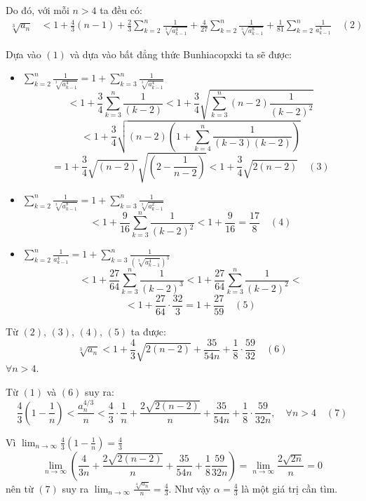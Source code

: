 \documentclass{article}
\begin{document}
Do đó, với mỗi $n > 4$ ta đều có:
\begin{align*}
\sqrt[3]{a_n} &< 1 + \frac{4}{3} (n-1) + 
\frac{2}{3}\sum_{k=2}^{n} \frac{1}{\sqrt[3]{a_{k-1}^4}} + 
\frac{4}{27}\sum_{k=2}^{n} \frac{1}{\sqrt[3]{a_{k-1}^8}} + 
\frac{1}{81}\sum_{k=2}^{n} \frac{1}{a_{k-1}^4} \quad (2)
\end{align*}

Dựa vào $(1)$ và dựa vào bất đẳng thức Bunhiacopxki ta sẽ được:
\begin{itemize}
    \item $ \sum_{k=2}^{n} \frac{1}{\sqrt[3]{a_{k-1}^4}} = 1 + \sum_{k=3}^{n} \frac{1}{\sqrt[3]{a_{k-1}^4}} $
    $$ < 1 + \frac{3}{4}\sum_{k=3}^{n} \frac{1}{(k-2)} < 1 + \frac{3}{4}  \sqrt{\sum_{k=3}^{n} (n-2) \frac{1}{(k-2)^2}} $$
    $$ < 1 + \frac{3}{4} \sqrt{(n-2)(1 + \sum_{k=4}^{n} \frac{1}{(k-3)(k-2)})} $$
    $$ = 1 + \frac{3}{4} \sqrt{(n-2)} \sqrt{(2 - \frac{1}{n-2})} < 1 + \frac{3}{4} \sqrt{2(n-2)} \quad (3) $$

    \item $ \sum_{k=2}^{n} \frac{1}{\sqrt[3]{a_{k-1}^8}} = 1 + \sum_{k=3}^{n} \frac{1}{\sqrt[3]{a_{k-1}^2}} $
    $$ < 1 + \frac{9}{16} \sum_{k=3}^{n} \frac{1}{(k-2)^2} < 1 + \frac{9}{16} = \frac{17}{8} \quad (4) $$

    \item $ \sum_{k=2}^{n} \frac{1}{a_{k-1}^4} = 1 + \sum_{k=3}^{n} \frac{1}{(\sqrt[3]{a_{k-1}^4})^3} $
    $$ < 1 + \frac{27}{64} \sum_{k=3}^{n} \frac{1}{(k-2)^3} < 1 + \frac{27}{64} \sum_{k=3}^{n} \frac{1}{(k-2)^2} < $$
    $$ < 1 + \frac{27}{64} \cdot \frac{32}{3} = 1 + \frac{27}{59} \quad (5) $$
\end{itemize}

Từ $(2)$, $(3)$, $(4)$, $(5)$ ta được:
$$ \sqrt[3]{a_n} < 1 + \frac{4}{3} \sqrt{2(n-2)} + \frac{35}{54n} + \frac{1}{8} \cdot \frac{59}{32} \quad (6) $$
$\forall n > 4$.

Từ $(1)$ và $(6)$ suy ra:
$$ \frac{4}{3} \left(1 - \frac{1}{n}\right) < \frac{a_n^{4/3}}{n} < \frac{4}{3} \cdot \frac{1}{n} + \frac{2\sqrt{2(n-2)}}{n} + \frac{35}{54n} + \frac{1}{8} \cdot \frac{59}{32n}, \quad \forall n > 4 \quad (7) $$

Vì $\lim_{n \to \infty} \frac{4}{3} \left(1 - \frac{1}{n}\right) = \frac{4}{3}$
$$ \lim_{n \to \infty} \left(\frac{4}{3n} + \frac{2\sqrt{2(n-2)}}{n} + \frac{35}{54n} + \frac{1}{8} \frac{59}{32n}\right) = \lim_{n \to \infty} \frac{2\sqrt{2n}}{n} = 0 $$
nên từ $(7)$ suy ra $\lim_{n \to \infty} \frac{\sqrt[4]{a_n}}{n} = \frac{4}{3}$.
Như vậy $\alpha = \frac{4}{3}$ là một giá trị cần tìm.
\end{document}
